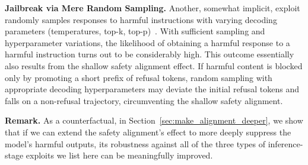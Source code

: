 




\textbf{Jailbreak via Mere Random Sampling.} Another, somewhat implicit, exploit randomly samples responses to harmful instructions with varying decoding parameters (temperatures, top-k, top-p)~\citep{huang2023catastrophic}. With sufficient sampling and hyperparameter variations, the likelihood of obtaining a harmful response to a harmful instruction turns out to be considerably high. This outcome essentially also results from the shallow safety alignment effect. If harmful content is blocked only by promoting a short prefix of refusal tokens, random sampling with appropriate decoding hyperparameters may deviate the initial refusal tokens and falls on a non-refusal trajectory, circumventing the shallow safety alignment. 


\textbf{Remark.} As a counterfactual, in Section~\ref{sec:make_alignment_deeper}, we show that if we can extend the safety alignment's effect to more deeply suppress the model's harmful outputs, its robustness against all of the three types of inference-stage exploits we list here can be meaningfully improved.









